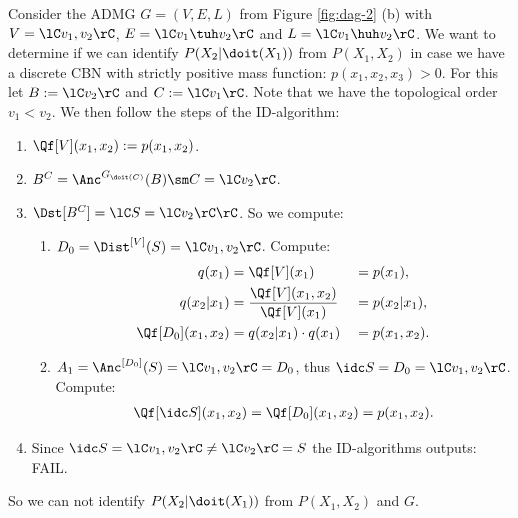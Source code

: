 \begin{Eg}
    Consider the ADMG $G=(V,E,L)$ from Figure \ref{fig:dag-2} (b) with $V=\lC v_1,v_2 \rC$, 
    $E=\lC v_1 \tuh v_2 \rC$ and $L=\lC v_1 \huh v_2 \rC$.
     We want to determine if we can identify $P(X_2|\doit(X_1))$ from $P(X_1,X_2)$ in case we have a discrete CBN with strictly positive mass function: $p(x_1,x_2,x_3) >0$.  
     For this let $B:=\lC v_2 \rC$ and $C:=\lC v_1 \rC$. Note that we have the topological order $v_1 < v_2$.
    We then follow the steps of the ID-algorithm:
    \begin{enumerate}
        \item $\Qf[V](x_1,x_2) := p(x_1,x_2)$.
        \item $B^C = \Anc^{G_{\doit(C)}}(B) \sm C = \lC v_2\rC$.
        \item $\Dst[B^C] =\lC S=\lC v_2 \rC \rC$. So we compute:
            \begin{enumerate}
                \item $D_{0} = \Dist^{[V]}(S) = \lC v_1,v_2 \rC$. Compute:
                    \begin{align*}
                        q(x_1) &=  \Qf[V](x_1) &&= p(x_1), \\
                        q(x_2|x_1) &= \frac{\Qf[V](x_1,x_2)}{\Qf[V](x_1)} && = p(x_2|x_1), \\
                        \Qf[D_{0}](x_1,x_2) &= q(x_2|x_1) \cdot q(x_1) &&= p(x_1,x_2).
                    \end{align*}
                \item $A_{1} = \Anc^{[D_{0}]}(S) = \lC v_1,v_2\rC=D_{0}$, thus $\idc S = D_{0}=\lC v_1,v_2 \rC$. Compute:
                    \begin{align*}
                        \Qf[\idc S](x_1,x_2) = \Qf[D_{0}](x_1,x_2) = p(x_1,x_2). 
                    \end{align*}
            \end{enumerate}
        \item Since $\idc S = \lC v_1,v_2 \rC \neq \lC v_2 \rC = S$ the ID-algorithms outputs: FAIL.
    \end{enumerate}
    So we can not identify $P(X_2|\doit(X_1))$ from $P(X_1,X_2)$ and $G$.
\end{Eg}

